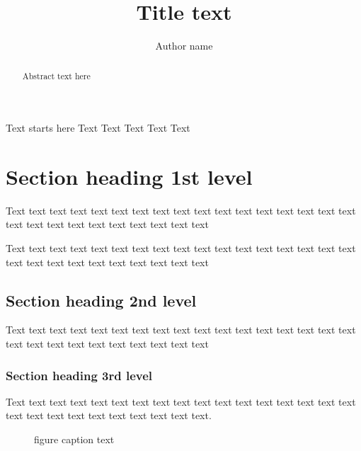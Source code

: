 \documentclass{cupjournal}
\begin{document}


\title{Title text}

\author{Author name}

\maketitle

\begin{abstract}
Abstract text here
\end{abstract}

Text starts here Text Text Text Text Text \citep{Ariely1998}


\section{Section heading 1st level}
Text text text text text text text text text text text text text text text text text text text text text text text text text text text \citep{atheydiffndiff2005}


Text text text text text text text text text text text text text text text text text text text text text text text text text text text

\subsection{Section heading 2nd level}
Text text text text text text text text text text text text text text text text text text text text text text text text text text text

\subsubsection{Section heading 3rd level}
Text text text text text text text text text text text text text text text text text text text text text text text text text text text.

\begin{figure}[htbp]
\caption{figure caption text}
\end{figure}

\printbibliography
\end{document}
